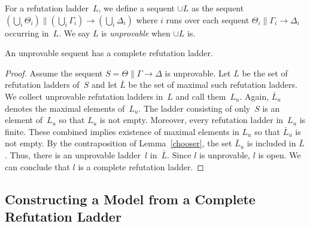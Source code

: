 For a refutation ladder~$L$, we define a sequent $\cup L$ as
the sequent $\left(\bigcup_i \Theta_i\right)\parallel \left(\bigcup_i \Gamma_i\right)\longrightarrow
\left(\bigcup_i\Delta_i\right)$ where $i$ runs over
each sequent $\Theta_i\parallel \Gamma_i\longrightarrow\Delta_i$
occurring in~$L$.
We say $L$ is \textit{unprovable} when $\cup L$ is.

\begin{lemma}
 \label{comprefl}
 An unprovable sequent has a complete refutation ladder.
\end{lemma}
\begin{proof}
Assume the sequent
$S = \Theta\parallel \Gamma\longrightarrow\Delta$
is unprovable.
Let $L$ be the set of refutation ladders of~$S$ and
let $\bar L$ be the set of maximal such refutation ladders.
We collect unprovable refutation ladders in~$L$ and call them~$L_u$.
Again, $\bar L_u$ denotes the maximal elements of~$L_u$.
The ladder consisting of only~$S$ is an element of~$L_u$
so that $L_u$ is not empty.
 Moreover, every refutation ladder in~$L_u$ is finite.
These combined implies existence of maximal elements in $L_u$ so that $\bar L_u$ is not empty.
By the contraposition of Lemma~\ref{chooser}, the set $\bar L_u$ is included in $\bar L$.
Thus, there is an unprovable ladder~$l$ in~$\bar L$.
Since $l$ is unprovable, $l$ is open.
We can conclude that $l$ is a complete refutation ladder. 
\end{proof}


\subsection{Constructing a Model from a Complete Refutation Ladder}

